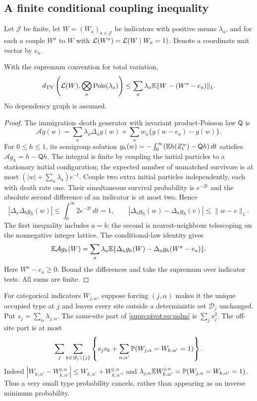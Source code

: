 \subsection{A finite conditional coupling inequality}
Let $\mathcal J$ be finite, let $W=(W_a)_{a\in\mathcal J}$ be indicators with positive means $\lambda_a$, and for each $a$ couple $W^a$ to $W$ with
$\mathcal L(W^a)=\mathcal L(W\mid W_a=1)$. Denote a coordinate unit vector by $e_a$.
\begin{lemma}\label{supp:pivot:lem:palm}
With the supremum convention for total variation,
\begin{equation}\label{supp:pivot:eq:palm}
 d_{\mathrm{TV}}\left(\mathcal L(W),\bigotimes_a\operatorname{Pois}(\lambda_a)\right)
 \le\sum_a\lambda_a\mathbb E\|W-(W^a-e_a)\|_1.
\end{equation}
No dependency graph is assumed.
\end{lemma}
\begin{proof}
The immigration--death generator with invariant product-Poisson law $\mathsf Q$ is
\[
 \mathcal A g(w)=\sum_a\lambda_a\Delta_a g(w)
                +\sum_a w_a\{g(w-e_a)-g(w)\}.
\]
For $0\le h\le1$, its semigroup solution
$g_h(w)=-\int_0^\infty(\mathbb E h(Z_t^w)-\mathsf Qh)\,dt$
satisfies $\mathcal A g_h=h-\mathsf Qh$.
The integral is finite by coupling the initial particles to a stationary initial configuration; the expected number of unmatched survivors is at most
$(|w|+\sum_a\lambda_a)e^{-t}$.
Couple two extra initial particles independently, each with death rate one. Their simultaneous survival probability is $e^{-2t}$ and the absolute second difference of an indicator is at most two. Hence
\[
 |\Delta_a\Delta_b g_h(w)|\le\int_0^\infty2e^{-2t}\,dt=1,
 \qquad
 |\Delta_a g_h(w)-\Delta_a g_h(v)|\le\|w-v\|_1.
\]
The first inequality includes $a=b$; the second is nearest-neighbour telescoping on the nonnegative integer lattice. The conditional-law identity gives
\[
 \mathbb E\mathcal A g_h(W)=\sum_a\lambda_a
       \mathbb E\{\Delta_a g_h(W)-\Delta_a g_h(W^a-e_a)\}.
\]
Here $W^a-e_a\ge0$. Bound the differences and take the supremum over indicator tests. All sums are finite.
\end{proof}

For categorical indicators $W_{j,\alpha}$, suppose forcing $(j,\alpha)$ makes it the unique occupied type at $j$ and leaves every site outside a deterministic set $\mathscr D_j$ unchanged. Put $s_j=\sum_\alpha\lambda_{j,\alpha}$. The same-site part of \eqref{supp:pivot:eq:palm} is $\sum_j s_j^2$. The off-site part is at most
\begin{equation}\label{supp:pivot:eq:categorical}
 \sum_j\sum_{k\in\mathscr D_j\setminus\{j\}}
 \left\{s_js_k+\sum_{\alpha,\alpha'}
           \mathbb P(W_{j,\alpha}=W_{k,\alpha'}=1)\right\}.
\end{equation}
Indeed $|W_{k,\alpha'}-W^{j,\alpha}_{k,\alpha'}|
\le W_{k,\alpha'}+W^{j,\alpha}_{k,\alpha'}$, and
$\lambda_{j,\alpha}\mathbb E W^{j,\alpha}_{k,\alpha'}
=\mathbb P(W_{j,\alpha}=W_{k,\alpha'}=1)$.
Thus a very small type probability cancels, rather than appearing as an inverse minimum probability.

